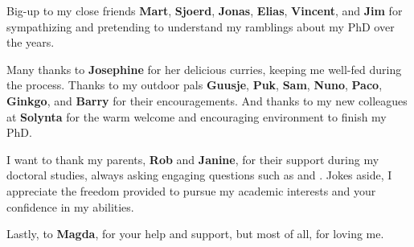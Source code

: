 \bigbreak \noindent
Big-up to my close friends \textbf{Mart}, \textbf{Sjoerd}, \textbf{Jonas}, \textbf{Elias}, \textbf{Vincent}, and \textbf{Jim} for sympathizing and pretending to understand my ramblings about my PhD over the years. 

\bigbreak \noindent
Many thanks to \textbf{Josephine} for her delicious curries, keeping me well-fed during the process. Thanks to my outdoor pals \textbf{Guusje}, \textbf{Puk}, \textbf{Sam}, \textbf{Nuno}, \textbf{Paco}, \textbf{Ginkgo}, and \textbf{Barry} for their encouragements. And thanks to my new colleagues at \textbf{Solynta} for the warm welcome and encouraging environment to finish my PhD. 

\bigbreak \noindent
I want to thank my parents, \textbf{Rob} and \textbf{Janine}, for their support during my doctoral studies, always asking engaging questions such as  and . Jokes aside, I appreciate the freedom provided to pursue my academic interests and your confidence in my abilities.

\bigbreak \noindent
Lastly, to \textbf{Magda}, for your help and support, but most of all, for loving me. 

\newpage